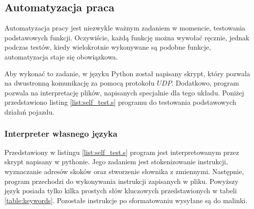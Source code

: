     \subsection{Automatyzacja praca}
        Automatyzacja pracy jest niezwykle ważnym zadaniem w momencie, testowania podstawowych funkcji.
        Oczywiście, każdą funkcję można wywołać ręcznie, jednak podczas testów, kiedy wielokrotnie wykonywane są podobne funkcje, automatyzacja staje się obowiązkowa.

        Aby wykonać to zadanie, w języku Python został napisany skrypt, który pozwala na dwustronną komunikację za pomocą protokołu $UDP$.
        Dodatkowo, program pozwala na interpretację plików, napisanych specjalnie dla tego układu.
        Poniżej przedstawiono listing \eqref{list:self_test.s} programu do testowania podstawowych działań pojazdu.

        

        \subsubsection{Interpreter własnego języka}
            Przedstawiony w listingu \ref{list:self_test.s} program jest interpretowanym przez skrypt napisany w pythonie.
            Jego zadaniem jest stokenizowanie instrukcji, wyznaczanie adresów skoków oraz stworzenie słownika z zmiennymi.
            Następnie, program przechodzi do wykonywania instrukcji zapisanych w pliku.
            Powyższy język posiada tylko kilka prostych słów kluczowych przedstawionych w tabeli \ref{table:keywords}.
            Pozostałe instrukcje po sformatowaniu wysyłane są do malinki.

